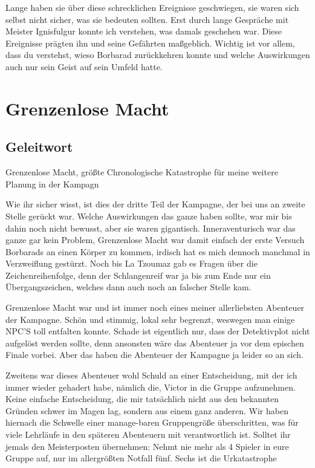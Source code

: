 Lange haben sie über diese schrecklichen Ereignisse geschwiegen, sie waren sich selbst nicht sicher, was sie bedeuten sollten. Erst durch lange Gespräche mit Meister Ignisfulgur konnte ich verstehen, was damals geschehen war. Diese Ereignisse prägten ihn und seine Gefährten maßgeblich. Wichtig ist vor allem, dass du verstehst, wieso Borbarad zurückkehren konnte und welche Auswirkungen auch nur sein Geist auf sein Umfeld hatte.

\chapter{Grenzenlose Macht}

\section{Geleitwort}
Grenzenlose Macht, größte Chronologische Katastrophe für meine weitere Planung in der Kampagn

Wie ihr sicher wisst, ist dies der dritte Teil der Kampagne, der bei uns an zweite Stelle gerückt war. Welche Auswirkungen das ganze haben sollte, war mir bis dahin noch nicht bewusst, aber sie waren gigantisch. Inneraventurisch war das ganze gar kein Problem, Grenzenlose Macht war damit einfach der erste Versuch Borbarads an einen Körper zu kommen, irdisch hat es mich dennoch manchmal in Verzweiflung gestürzt. Noch bis La Tzoumaz gab es Fragen über die Zeichenreihenfolge, denn der Schlangenreif war ja bis zum Ende nur ein Übergangszeichen, welches dann auch noch an falscher Stelle kam.

Grenzenlose Macht war und ist immer noch eines meiner allerliebsten Abenteuer der Kampagne. Schön und stimmig, lokal sehr begrenzt, weswegen man einige NPC'S toll entfalten konnte. Schade ist eigentlich nur, dass der Detektivplot  nicht aufgelöst werden sollte, denn ansonsten wäre das Abenteuer ja vor dem epischen Finale vorbei. Aber das haben die Abenteuer der Kampagne ja leider so an sich.

Zweitens war dieses Abenteuer wohl Schuld an einer Entscheidung, mit der ich immer wieder gehadert habe, nämlich die, Victor in die Gruppe aufzunehmen. Keine einfache Entscheidung, die mir tatsächlich nicht aus den bekannten Gründen schwer im Magen lag, sondern aus einem ganz anderen. Wir haben hiernach die Schwelle einer manage-baren Gruppengröße überschritten, was für viele Lehrläufe in den späteren Abenteuern mit verantwortlich ist. Solltet ihr jemals den Meisterposten übernehmen: Nehmt nie mehr als 4 Spieler in eure Gruppe auf, nur im allergrößten Notfall fünf. Sechs ist die Urkatastrophe

